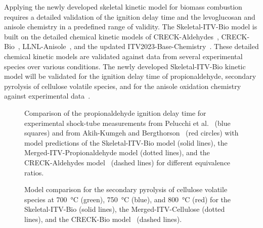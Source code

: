 \begin{refsection}
Applying the newly developed skeletal kinetic model for biomass combustion requires a detailed validation of the ignition delay time and the levoglucosan and anisole chemistry in a predefined range of validity. The Skeletal-ITV-Bio model is built on the detailed chemical kinetic models of CRECK-Aldehydes~\cite{Pelucchi2015}, CRECK-Bio~\cite{Debiagi2016}, LLNL-Anisole~\cite{Wagnon2018}, and the updated ITV2023-Base-Chemistry~\cite{Langer2023}. These detailed chemical kinetic models are validated against data from several experimental species over various conditions. The newly developed Skeletal-ITV-Bio kinetic model will be validated for the ignition delay time of propionaldehyde, secondary pyrolysis of cellulose volatile species, and for the anisole oxidation chemistry against experimental data~\cite{Pelucchi2015, AkihKumgeh2011, Chen2022}.
\begin{figure}[h]
  \centering
  \hfill
  \hfill
  \caption{Comparison of the propionaldehyde ignition delay time for experimental shock-tube measurements from Pelucchi et al.~\cite{Pelucchi2015} (blue squares) and from Akih-Kumgeh and Bergthorson~\cite{AkihKumgeh2011} (red circles) with model predictions of the Skeletal-ITV-Bio model (solid lines), the Merged-ITV-Propionaldehyde model (dotted lines), and the CRECK-Aldehydes model~\cite{Pelucchi2015} (dashed lines) for different equivalence ratios.}
  \label{fig:B1bIDTPropionaldehydeBioMechanism}
\end{figure}
\begin{figure}[b]
  \centering
  \hfill
  \hfill
  \caption{Model comparison for the secondary pyrolysis of cellulose volatile species at \SI{700}{\celsius} (green), \SI{750}{\celsius} (blue), and \SI{800}{\celsius} (red) for the Skeletal-ITV-Bio (solid lines), the Merged-ITV-Cellulose (dotted lines), and the CRECK-Bio model~\cite{Debiagi2016} (dashed lines).}

\end{figure}
\end{refsection}
